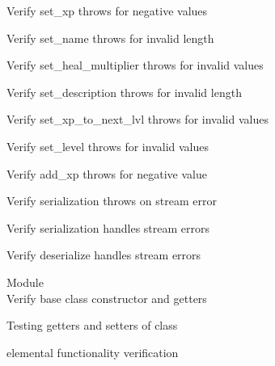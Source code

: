 \begin{DoxyRefList}
\label{test__test000078}%
%
Verify set\+\_\+xp throws for negative values  



\label{test__test000080}%
%
Verify set\+\_\+name throws for invalid length  



\label{test__test000082}%
%
Verify set\+\_\+heal\+\_\+multiplier throws for invalid values  



\label{test__test000084}%
%
Verify set\+\_\+description throws for invalid length  



\label{test__test000086}%
%
Verify set\+\_\+xp\+\_\+to\+\_\+next\+\_\+lvl throws for invalid values  



\label{test__test000088}%
%
Verify set\+\_\+level throws for invalid values  



\label{test__test000095}%
%
Verify add\+\_\+xp throws for negative value  



\label{test__test000108}%
%
Verify serialization throws on stream error  



\label{test__test000111}%
%
Verify serialization handles stream errors  



\label{test__test000112}%
%
Verify deserialize handles stream errors  


\item[Module \doxylink{group___g_c_i}{GCI} ]\hfill \\
\label{test__test000001}%
%
Verify base  class constructor and getters  



\label{test__test000002}%
%
Testing getters and setters of  class  



\label{test__test000007}%
%
 elemental functionality verification  




\end{DoxyRefList}
